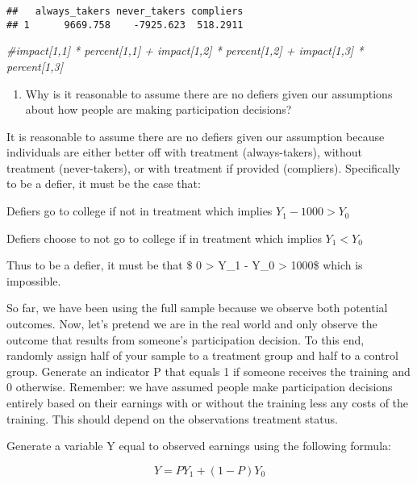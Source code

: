 \documentclass[
]{article}
\newenvironment{Shaded}{\begin{snugshade}}{\end{snugshade}}
\newcommand{\CommentTok}[1]{\textcolor[rgb]{0.56,0.35,0.01}{\textit{#1}}}
\providecommand{\tightlist}{%
  \setlength{\itemsep}{0pt}\setlength{\parskip}{0pt}}
\begin{document}
\begin{verbatim}
##   always_takers never_takers compliers
## 1      9669.758    -7925.623  518.2911
\end{verbatim}

\begin{Shaded}
\begin{Highlighting}[]
\CommentTok{\#impact[1,1] * percent[1,1] + impact[1,2] * percent[1,2] + impact[1,3] * percent[1,3]}
\end{Highlighting}
\end{Shaded}

\begin{enumerate}
\def\labelenumi{\arabic{enumi}.}
\setcounter{enumi}{3}
\tightlist
\item
  Why is it reasonable to assume there are no defiers given our
  assumptions about how people are making participation decisions?
\end{enumerate}

It is reasonable to assume there are no defiers given our assumption
because individuals are either better off with treatment
(always-takers), without treatment (never-takers), or with treatment if
provided (compliers). Specifically to be a defier, it must be the case
that:

Defiers go to college if not in treatment which implies
\(Y_1 - 1000 > Y_0\)

Defiers choose to not go to college if in treatment which implies
\(Y_1 < Y_0\)

Thus to be a defier, it must be that \$ 0 \textgreater{} Y\_1 - Y\_0
\textgreater{} 1000\$ which is impossible.

\newpage

So far, we have been using the full sample because we observe both
potential outcomes. Now, let's pretend we are in the real world and only
observe the outcome that results from someone's participation decision.
To this end, randomly assign half of your sample to a treatment group
and half to a control group. Generate an indicator P that equals 1 if
someone receives the training and 0 otherwise. Remember: we have assumed
people make participation decisions entirely based on their earnings
with or without the training less any costs of the training. This should
depend on the observations treatment status.

Generate a variable Y equal to observed earnings using the following
formula:

\[
Y = PY_1 + (1-P)Y_0
\]
\end{document}
